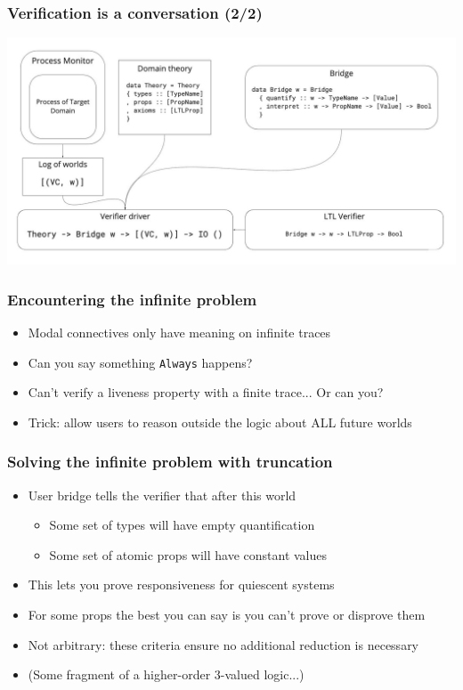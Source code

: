 \documentclass[12pt,aspectratio=169]{beamer}
\begin{document}
\begin{frame}
\frametitle{Verification is a conversation (2/2)}
  \includegraphics[scale=0.27]{diagram.jpg}
  \centering
\end{frame}

\begin{frame}
\frametitle{Encountering the infinite problem}
\begin{itemize}
  \item Modal connectives only have meaning on infinite traces
  \item Can you say something \texttt{Always} happens?
  \item Can't verify a liveness property with a finite trace... Or can you?
  \item Trick: allow users to reason outside the logic about ALL future worlds
\end{itemize}
\end{frame}

\begin{frame}
\frametitle{Solving the infinite problem with truncation}
\begin{itemize}
  \item User bridge tells the verifier that after this world
  \begin{itemize}
    \item Some set of types will have empty quantification
    \item Some set of atomic props will have constant values
  \end{itemize}
  \item This lets you prove responsiveness for quiescent systems
  \item For some props the best you can say is you can't prove or disprove them
  \item Not arbitrary: these criteria ensure no additional reduction is necessary
  \item (Some fragment of a higher-order 3-valued logic...)
\end{itemize}
\end{frame}
\end{document}
